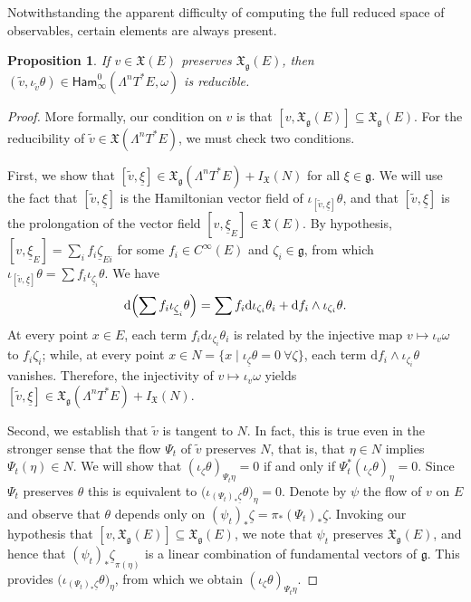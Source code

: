 \documentclass[10pt,a4paper]{amsart}
\numberwithin{equation}{section}
\newtheorem{Proposition}[Theorem]{Proposition}
 { \theoremstyle{definition}
\newtheorem{Definition}[Theorem]{Definition}
\newtheorem{Note}[Theorem]{Note}
\newtheorem{Example}[Theorem]{Example}
\newtheorem{Remark}[Theorem]{Remark} }
\newcommand{\g}{\mathfrak{g}}
\newcommand{\Ham}{\mathsf{Ham}}
\newcommand{\X}{\mathfrak{X}}
\renewcommand{\subset}{\subseteq}
\renewcommand{\d}{\mathrm{d}}
\begin{document}
Notwithstanding the apparent difficulty of computing the full reduced space of observables, certain elements are always present.

\begin{Proposition}\label{prop:reducible_observables_on_multicotangent_bundles}
	If $v\in\X(E)$ preserves $\X_\g(E)$, then $(\tilde v,\iota_{\tilde v}\theta)\in\Ham_\infty^0(\Lambda^nT^*E,\omega)$ is reducible.
\end{Proposition}

\begin{proof}
	More formally, our condition on $v$ is that $[v, \X_\g(E)]\subset \X_\g(E)$. For the reducibility of $\tilde v\in \X(\Lambda^nT^*E)$, we must check two conditions.
	
	First, we show that $[\tilde v, \underline \xi]\in \X_\g(\Lambda^nT^*E)+ I_\X(N)$ for all $\xi \in \g$. We will use the fact that $[\tilde v, \underline \xi]$ is the Hamiltonian vector field of $\iota_{[\tilde v, \underline \xi]}\theta$, and that $[\tilde v, \underline\xi]$ is the prolongation of the vector field  $[v, \underline\xi_E]\in \X(E)$. By hypothesis, $[v,\underline\xi_E] = \sum_i f_i\underline\zeta_{Ei}$ for some $f_i\in C^\infty(E)$ and $\zeta_i\in\g$, from which $\iota_{[\tilde v, \underline \xi]}\theta=\sum f_i\iota_{\underline \zeta_i}\theta$. We have
	\[
		\d\Bigl(\sum f_i\iota_{\underline\zeta_i}\theta\Bigr)=\sum f_i \d\iota_{\zeta_i}\theta_i +\d f_i\wedge \iota_{\zeta_i}\theta.
	\]
	At every point $x\in E$, each term $f_i\d\iota_{\zeta_i}\theta_i$ is related by the injective map $v\mapsto\iota_v\omega$ to $f_i \zeta_i$; while, at every point $x\in N=\{x\mid \iota_{\underline{\zeta}}\theta=0~\forall\zeta\}$, each term $\d f_i\wedge\iota_{\zeta_i}\theta$ vanishes. Therefore, the injectivity of $v\mapsto\iota_v\omega$ yields $[\tilde v, \underline \xi]\in \X_\g(\Lambda^nT^*E)+I_\X(N)$.
	
	Second, we establish that $\tilde v$ is tangent to $N$. In fact, this is true even in the stronger sense that the flow $\Psi_t$ of $\tilde v$ preserves $N$, that is, that $\eta\in N$ implies $\Psi_t(\eta)\in N$. We will show that $(\iota_\zeta\theta)_{\Psi_t\eta}=0$ if and only if $\Psi_t^* (\iota_\zeta\theta)_\eta=0$. Since $\Psi_t$ preserves $\theta$ this is equivalent to $ \bigl(\iota_{(\Psi_t)_*\underline{\zeta}}\theta\bigr)_{\eta}=0$. Denote by $\psi$ the flow of $v$ on $E$ and observe that $\theta$ depends only on $(\psi_{t})_*\underline{\zeta}=\pi_*(\Psi_{t})_*\underline{\zeta}$. Invoking our hypothesis that $[v, \X_\g(E)]\subset \X_\g(E)$, we note that $\psi_t$ preserves $\X_\g(E)$, and hence that ${(\psi_{t})_*\underline{\zeta}}_{\pi(\eta)}$ is a linear combination of fundamental vectors of $\g$. This provides $\bigl(\iota_{(\Psi_t)_*\underline{\zeta}}\theta\bigr)_{\eta}$, from which we obtain $(\iota_\zeta\theta)_{\Psi_t\eta}$.
	

\end{proof}
\end{document}
